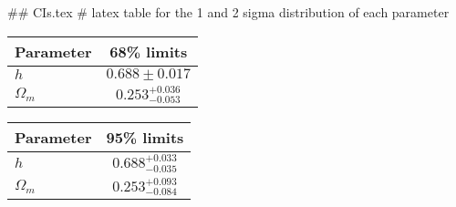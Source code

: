 ## CIs.tex
# latex table for the 1 and 2 sigma distribution of each parameter

\begin{tabular} { l  c}
 Parameter &  68\% limits\\
\hline
{\boldmath$h              $} & $0.688\pm 0.017            $\\
{\boldmath$\Omega_m       $} & $0.253^{+0.036}_{-0.053}   $\\
\hline
\end{tabular}

\begin{tabular} { l  c}
 Parameter &  95\% limits\\
\hline
{\boldmath$h              $} & $0.688^{+0.033}_{-0.035}   $\\
{\boldmath$\Omega_m       $} & $0.253^{+0.093}_{-0.084}   $\\
\hline
\end{tabular}
